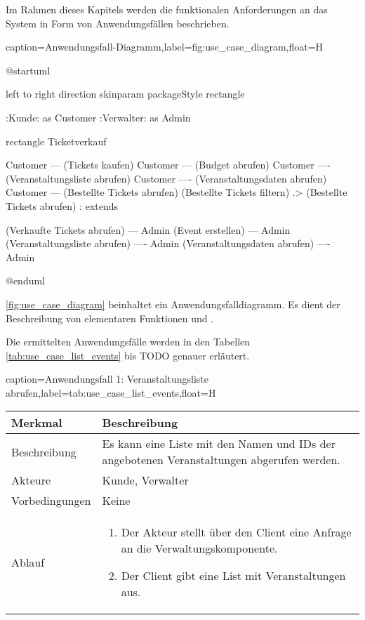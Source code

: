 Im Rahmen dieses Kapitels werden die funktionalen Anforderungen an das System in Form von Anwendungsfällen beschrieben. 

\begin{dhbwfigure}{caption=Anwendungsfall-Diagramm,label=fig:use_case_diagram,float=H}
    \begin{plantuml}
        @startuml

            left to right direction
            skinparam packageStyle rectangle

            :Kunde: as Customer
            :Verwalter: as Admin

            rectangle Ticketverkauf {
                Customer --- (Tickets kaufen)
                Customer --- (Budget abrufen)
                Customer ---- (Veranstaltungsliste abrufen)
                Customer ---- (Veranstaltungsdaten abrufen)
                Customer --- (Bestellte Tickets abrufen)
                (Bestellte Tickets filtern) .> (Bestellte Tickets abrufen) : extends

                (Verkaufte Tickets abrufen) --- Admin
                (Event erstellen) --- Admin
                (Veranstaltungsliste abrufen) ---- Admin
                (Veranstaltungsdaten abrufen) ---- Admin
            }
        @enduml
    \end{plantuml}
\end{dhbwfigure}

\autoref{fig:use_case_diagram} beinhaltet ein Anwendungsfalldiagramm.
Es dient der Beschreibung von elementaren Funktionen und .

Die ermittelten Anwendungsfälle werden in den Tabellen \ref{tab:use_case_list_events} bis TODO genauer erläutert.

\begin{dhbwtable}{caption={Anwendungsfall 1: Veranstaltungsliste abrufen},label={tab:use_case_list_events},float=H}
    \begin{tabularx}{\textwidth}{lX}
        \toprule
        \textbf{Merkmal} & \textbf{Beschreibung}  \\ \midrule
        Beschreibung    & Es kann eine Liste mit den Namen und IDs der angebotenen Veranstaltungen abgerufen werden. \\
        Akteure         & Kunde, Verwalter \\
        Vorbedingungen  & Keine \\
        Ablauf          & \begin{enumerate}
            \item Der Akteur stellt über den Client eine Anfrage an die Verwaltungskomponente.
            \item Der Client gibt eine List mit Veranstaltungen aus.
        \end{enumerate} \\\bottomrule
    \end{tabularx}    
\end{dhbwtable}

